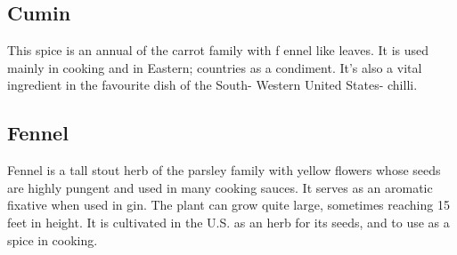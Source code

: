 \subsection{Cumin}
This spice is an annual of the carrot family with f ennel like leaves. It is
used mainly in cooking and in Eastern; countries as a condiment. It's also a
vital ingredient in the favourite dish of the South- Western United States-
chilli. 

\subsection{Fennel}
Fennel is a tall stout herb of the parsley family with yellow flowers whose
seeds are highly pungent and used in many cooking sauces. It serves as an
aromatic fixative when used in gin. The plant can grow quite large, sometimes
reaching 15 feet in height. It is cultivated in the U.S. as an herb for its
seeds, and to use as a spice in cooking. 


